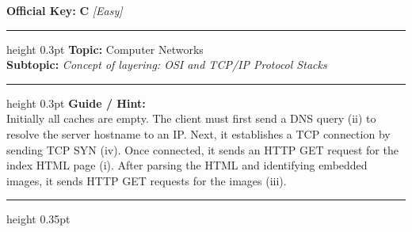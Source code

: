 \documentclass[a4paper,10pt]{article}
\begin{document}
\begin{tcolorbox}
\textbf{Official Key:} \textbf{\large C} \hfill \textit{\small [Easy]}
\vspace{2pt}\hrule height 0.3pt\vspace{3pt}
\textbf{Topic:} Computer Networks \\
\textbf{Subtopic:} \textit{Concept of layering: OSI and TCP/IP Protocol Stacks}
\vspace{2pt}\hrule height 0.3pt\vspace{3pt}
\textbf{Guide / Hint:} \\
{\small Initially all caches are empty. The client must first send a DNS query (ii) to resolve the server hostname to an IP. Next, it establishes a TCP connection by sending TCP SYN (iv). Once connected, it sends an HTTP GET request for the index HTML page (i). After parsing the HTML and identifying embedded images, it sends HTTP GET requests for the images (iii).}

\end{tcolorbox}
\vspace{6pt}\hrule height 0.35pt\vspace{6pt}
\noindent
\end{document}
